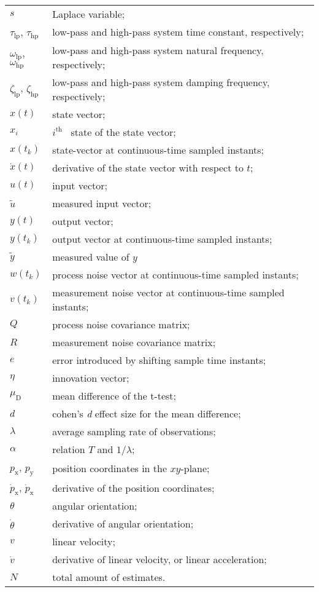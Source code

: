 \begin{longtable}{ll}
	$s$						& Laplace variable; \\
	$\tau_{\textrm{lp}}$,
	$\tau_{\textrm{hp}}$	& low-pass and high-pass system time constant, respectively; \\
	$\omega_{\textrm{lp}}$,
	$\omega_{\textrm{hp}}$	& low-pass and high-pass system natural frequency, respectively; \\
	$\zeta_{\textrm{lp}}$,
	$\zeta_{\textrm{hp}}$	& low-pass and high-pass system damping frequency, respectively; \\
	$x(t)$					& state vector; \\
	$x_i$					& $i^{\textrm{th}}$ \ state of the state vector; \\
	$x(t_k)$				& state-vector at continuous-time sampled instants; \\
	$\dot{x}(t)$			& derivative of the state vector with respect to $t$; \\
	$u(t)$					& input vector; \\
	$\tilde{u}$				& measured input vector; \\
	$y(t)$					& output vector; \\
	$y(t_k)$				& output vector at continuous-time sampled instants;\\
	$\tilde{y}$				& measured value of $y$ \\
	$w(t_k)$				& process noise vector at continuous-time sampled instants; \\
	$v(t_k)$				& measurement noise vector at continuous-time sampled instants; \\
	$Q$						& process noise covariance matrix; \\
	$R$						& measurement noise covariance matrix; \\
	$e$						& error introduced by shifting sample time instants; \\
	$\eta$					& innovation vector; \\
	$\mu_{\textrm{D}}$		& mean difference of the t-test; \\
	$d$						& cohen's \textit{d} effect size for the mean difference; \\
	
	$\lambda$				& average sampling rate of observations; \\
	$\alpha$				& relation $T$ and $1/ \lambda$; \\
	
	$p_\textrm{x}$,
	$p_\textrm{y}$			& position coordinates in the $xy$-plane; \\
	$\dot{p}_\textrm{x}$,
	$\dot{p}_\textrm{x}$ 	& derivative of the position coordinates; \\
	$\theta$				& angular orientation; \\
	$\dot{\theta}$			& derivative of angular orientation; \\
	$v$						& linear velocity; \\
	$\dot{v}$				& derivative of linear velocity, or linear acceleration; \\
	$N$						& total amount of estimates. \\

\end{longtable}



